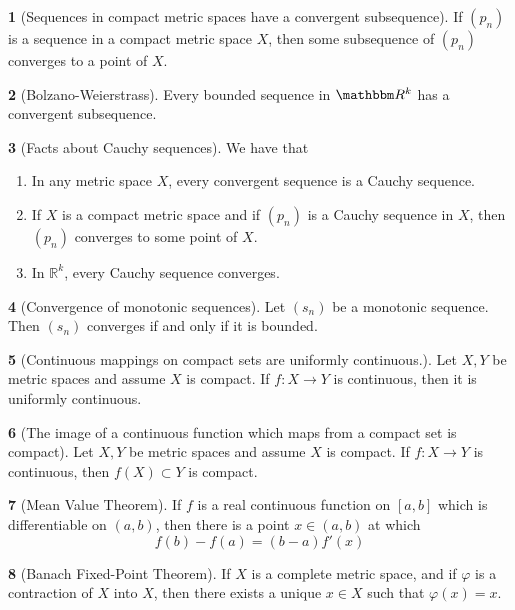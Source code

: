 \documentclass[12pt]{article}
\theoremstyle{definition}
\newtheorem{theorem}{\color{ForestGreen}{\textbf{Theorem}}}
\newcommand{\vp}{\varphi}
\newcommand{\R}{\mathbb{R}}
\newcommand{\RR}{\mathbbm R}
\begin{document}
\begin{theorem}[Sequences in compact metric spaces have a convergent subsequence]
If $(p_n)$ is a sequence in a compact metric space $X$, then some subsequence of $(p_n)$ converges to a point of $X$.
\end{theorem}

\begin{theorem}[Bolzano-Weierstrass]
Every bounded sequence in $\RR^k$ has a convergent subsequence.
\end{theorem}

\begin{theorem}[Facts about Cauchy sequences]
We have that
\begin{enumerate}
\item In any metric space $X$, every convergent sequence is a Cauchy sequence.
\item If $X$ is a compact metric space and if $(p_n)$ is a Cauchy sequence in $X$, then $(p_n)$ converges to some point of $X$.
\item In $\R^k$, every Cauchy sequence converges.
\end{enumerate}
\end{theorem}

\begin{theorem}[Convergence of monotonic sequences]
Let $(s_n)$ be a monotonic sequence. Then $(s_n)$ converges if and only if it is bounded.
\end{theorem}

\begin{theorem}[Continuous mappings on compact sets are uniformly continuous.]
Let $X,Y$ be metric spaces and assume $X$ is compact. If $f: X \to Y$ is continuous, then it is uniformly continuous.
\end{theorem}

\begin{theorem}[The image of a continuous function which maps from a compact set is compact]
Let $X,Y$ be metric spaces and assume $X$ is compact. If $f: X \to Y$ is continuous, then $f(X) \subset Y$ is compact.
\end{theorem}

\begin{theorem}[Mean Value Theorem]
If $f$ is a real continuous function on $[a,b]$ which is differentiable on $(a,b)$, then there is a point $x \in (a,b)$ at which
\begin{equation}
f(b) - f(a) = (b - a) f'(x)
\end{equation}
\end{theorem}

\begin{theorem}[Banach Fixed-Point Theorem]
If $X$ is a complete metric space, and if $\vp$ is a contraction of $X$ into $X$, then there exists a unique $x \in X$ such that $\vp(x) = x$.
\end{theorem}
\end{document}
